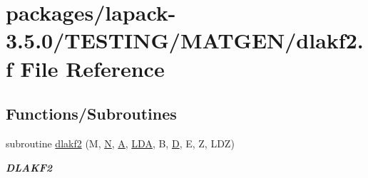\hypertarget{dlakf2_8f}{}\section{packages/lapack-\/3.5.0/\+T\+E\+S\+T\+I\+N\+G/\+M\+A\+T\+G\+E\+N/dlakf2.f File Reference}
\label{dlakf2_8f}
\subsection*{Functions/\+Subroutines}
\begin{DoxyCompactItemize}
\item 
subroutine \hyperlink{group__double__matgen_ga248f9b3d04b58e381d7d6e4fb30b5a77}{dlakf2} (M, \hyperlink{polmisc_8c_a0240ac851181b84ac374872dc5434ee4}{N}, \hyperlink{classA}{A}, \hyperlink{example__user_8c_ae946da542ce0db94dced19b2ecefd1aa}{L\+D\+A}, B, \hyperlink{odrpack_8h_a7dae6ea403d00f3687f24a874e67d139}{D}, E, Z, L\+D\+Z)
\begin{DoxyCompactList}\small\item\em {\bfseries D\+L\+A\+K\+F2} \end{DoxyCompactList}\end{DoxyCompactItemize}
